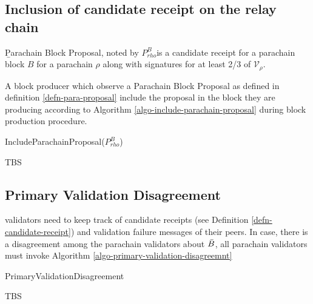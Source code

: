 \subsection{Inclusion of candidate receipt on the relay chain}\label{sect-inclusion-of-candidate-receipt}

\begin{definition}
  \label{defn-para-proposal}
        {\b Parachain Block Proposal}, noted by $P^B_{rho}$is a candidate receipt for a parachain block $B$ for a parachain $\rho$ along with signatures for at least 2/3 of $\mathcal{V}_\rho$.  %

\end{definition}

A block producer which observe a Parachain Block Proposal as defined in definition \ref{defn-para-proposal}  include the proposal in the block they are producing according to Algorithm \ref{algo-include-parachain-proposal} during block production procedure.

\begin{algorithm}
  \caption[]{\sc IncludeParachainProposal($P^B_{rho}$)}
  \label{algo-include-parachain-proposal}
  \begin{algorithmic}[1]
    \Require{}

    \State TBS
  \end{algorithmic}
\end{algorithm}


\subsection{Primary Validation Disagreement}
\label{sect-primary-validation-disagreemnt}
 validators need to keep track of candidate receipts (see Definition \ref{defn-candidate-receipt}) and validation failure messages of their peers. In case, there is a disagreement among the parachain validators about $\bar{B}$, all parachain validators must invoke Algorithm \ref{algo-primary-validation-disagreemnt}

\begin{algorithm}
  \caption[]{\sc PrimaryValidationDisagreement}
  \label{algo-primary-validation-disagreemnt}
  \begin{algorithmic}[1]
    \Require{}

    \State TBS
  \end{algorithmic}
\end{algorithm}

